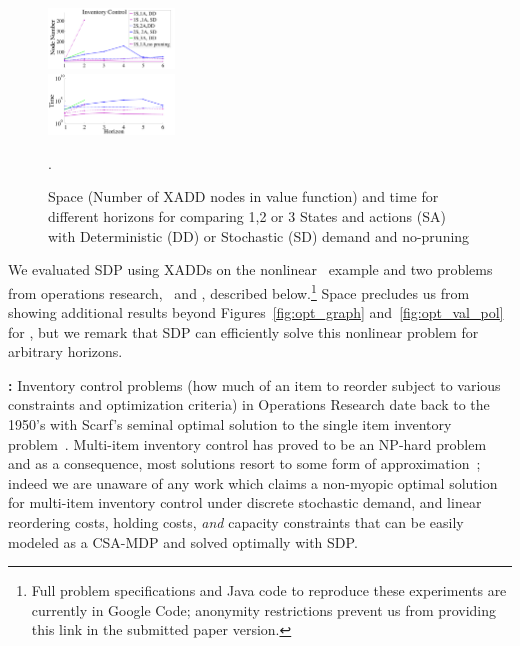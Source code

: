 \begin{figure}[tbp!]
\includegraphics[width=0.3\textwidth]{new_pics/space1.pdf}\\
\includegraphics[width=0.3\textwidth]{new_pics/time1.pdf}
\vspace{-2mm}
\caption{\footnotesize Space (Number of XADD nodes in value function) 
and time for different horizons for \InventoryControl comparing 
1,2 or 3 States and actions (SA) with Deterministic (DD) 
or Stochastic (SD) demand and no-pruning}.
\label{fig:invC}
\end{figure}

\label{sec:results}
 
We evaluated SDP using XADDs on the nonlinear
\MarsRover\ example and two problems from operations research,
\InventoryControl\ and \WaterReservoir, described below.\footnote{
Full problem specifications and Java code to
reproduce these experiments are currently 
in Google Code; anonymity restrictions 
prevent us from providing this link in the submitted paper version.}
Space precludes us from showing 
additional results beyond Figures~\ref{fig:opt_graph}
and~\ref{fig:opt_val_pol} for
\MarsRover, but we remark that SDP can efficiently solve this
nonlinear problem for arbitrary horizons.

{\bf \InventoryControl:} Inventory control problems (how much of an
item to reorder subject to various constraints and optimization
criteria) in Operations Research date back to the 1950's with Scarf's
seminal optimal solution to the single item inventory
problem~\cite{Scarf_Karlin58}.  Multi-item inventory control has
proved to be an NP-hard problem and as a consequence, most solutions
resort to some form of approximation~\cite{needref}; indeed we are
unaware of any work which claims a non-myopic optimal solution for
multi-item inventory control under discrete stochastic demand, and
linear reordering costs, holding costs, \emph{and} capacity
constraints that can be easily modeled as a CSA-MDP and solved
optimally with SDP.


